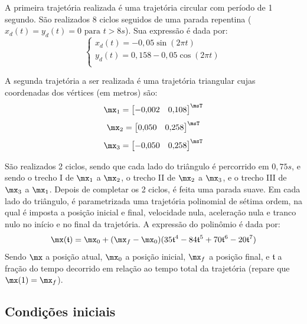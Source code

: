\documentclass[]{politex}
\begin{document}
A primeira trajetória realizada é uma trajetória circular com período de 1 segundo. São realizados 8 ciclos seguidos de uma parada repentina ($x_d(t) = y_d(t) = 0 \text{ para } t > 8s$). Sua expressão é dada por:
\begin{equation}
\begin{cases}
x_d(t) = -0{,}05 \sin(2\pi t) \\
y_d(t) = 0{,}158 - 0{,}05 \cos(2\pi t) \\
\end{cases}
\end{equation}

A segunda trajetória a ser realizada é uma trajetória triangular cujas coordenadas dos vértices (em metros) são:
\begin{equation} \label{eq:zeroMaquina}
\mx_1 = \begin{bmatrix}
-0{,}002 & 0{,}108 
\end{bmatrix}^\msT
\end{equation}
\begin{equation}
\mx_2 = \begin{bmatrix}
0{,}050 & 0{,}258 
\end{bmatrix}^\msT
\end{equation}
\begin{equation}
\mx_3 = \begin{bmatrix}
-0{,}050 & 0{,}258 
\end{bmatrix}^\msT
\end{equation}

São realizados 2 ciclos, sendo que cada lado do triângulo é percorrido em $0{,}75s$, e sendo o trecho I de $\mx_1$ a $\mx_2$, o trecho II de $\mx_2$ a $\mx_3$, e o trecho III de $\mx_3$ a $\mx_1$. Depois de completar os 2 ciclos, é feita uma parada suave. Em cada lado do triângulo, é parametrizada uma trajetória polinomial de sétima ordem, na qual é imposta a posição inicial e final, velocidade nula, aceleração nula e tranco nulo no início e no final da trajetória. A expressão do polinômio é dada por:
\begin{equation}
\mx(\mathfrak{t}) = \mx_0 + (\mx_f - \mx_0) (35 \mathfrak{t}^4 - 84 \mathfrak{t}^5 + 70 \mathfrak{t}^6 - 20 \mathfrak{t}^7)
\end{equation}
Sendo $\mx$ a posição atual, $\mx_0$ a posição inicial, $\mx_f$ a posição final, e $\mathfrak{t}$ a fração do tempo decorrido em relação ao tempo total da trajetória (repare que $\mx(1) = \mx_f$).

\subsection{Condições iniciais}
\end{document}
